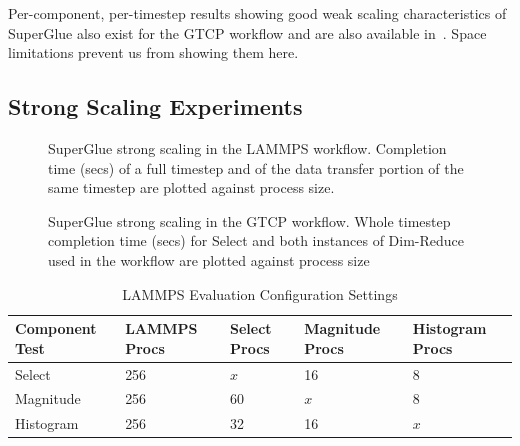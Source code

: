 Per-component, per-timestep results
showing good weak scaling characteristics of
SuperGlue
also exist for the GTCP workflow and are also
available in~\cite{champsaur:superglue-repo}.
Space limitations prevent us
from showing them here.

\subsection{Strong Scaling Experiments}


\begin{figure}
  \centering
  \vspace{-0.25in}
  
  \vspace{-0.15in}
  
  \vspace{-0.17in}
  
  \vspace{-0.05in}
  \caption{SuperGlue strong scaling in the LAMMPS workflow.
    Completion time (secs) of a full timestep and of the data transfer
    portion of the same timestep are plotted against process size.}
  \label{fig:lammps-strong}
  \vspace{-0.18in}
\end{figure}

\begin{figure}
  \centering
  \vspace{-0.17in}
  
  \vspace{-0.17in}
  
  \vspace{-0.06in}
  \caption{SuperGlue strong scaling in the GTCP workflow. Whole timestep
    completion time (secs) for Select and both instances of Dim-Reduce used in
    the workflow are plotted against process size}
  \label{fig:gtcp-strong}
  \vspace{-0.25in}
\end{figure}

  

\begin{table}[tbp]
\centering
\caption{LAMMPS Evaluation Configuration Settings}
\label{tab:eval-strong-lammps}
\vspace{-0.15in}
\begin{tabular}{|l|l|l|l|l|}
\hline
Component Test & LAMMPS Procs & Select Procs & Magnitude Procs & Histogram Procs \\
\hline
Select & 256 & $x$ & 16 & 8\\
\hline
Magnitude & 256 & 60 & $x$ & 8\\
\hline
Histogram & 256 & 32 & 16 & $x$\\
\hline
\end{tabular}
\end{table}


